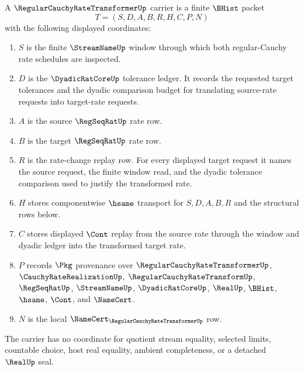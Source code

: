 \begin{definition}
\label{def:regular-cauchy-rate-transformer-carrier}
A $\RegularCauchyRateTransformerUp$ carrier is a finite $\BHist$ packet
$$
T=(S,D,A,B,R,H,C,P,N)
$$
with the following displayed coordinates:
\begin{enumerate}
\item $S$ is the finite $\StreamNameUp$ window through which both regular-Cauchy rate schedules are inspected.
\item $D$ is the $\DyadicRatCoreUp$ tolerance ledger. It records the requested target tolerances and the dyadic comparison budget for translating source-rate requests into target-rate requests.
\item $A$ is the source $\RegSeqRatUp$ rate row.
\item $B$ is the target $\RegSeqRatUp$ rate row.
\item $R$ is the rate-change replay row. For every displayed target request it names the source request, the finite window read, and the dyadic tolerance comparison used to justify the transformed rate.
\item $H$ stores componentwise $\hsame$ transport for $S,D,A,B,R$ and the structural rows below.
\item $C$ stores displayed $\Cont$ replay from the source rate through the window and dyadic ledger into the transformed target rate.
\item $P$ records $\Pkg$ provenance over $\RegularCauchyRateTransformerUp$, $\CauchyRateRealizationUp$, $\RegularCauchyRateTransformUp$, $\RegSeqRatUp$, $\StreamNameUp$, $\DyadicRatCoreUp$, $\RealUp$, $\BHist$, $\hsame$, $\Cont$, and $\NameCert$.
\item $N$ is the local $\NameCert_{\RegularCauchyRateTransformerUp}$ row.
\end{enumerate}
The carrier has no coordinate for quotient stream equality, selected limits, countable choice, host real equality, ambient completeness, or a detached $\RealUp$ seal.
\end{definition}

